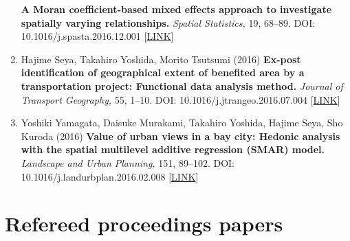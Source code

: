 \documentclass[
]{book}
\begin{document}
\begin{enumerate}
  \textbf{A Moran coefficient-based mixed effects approach to investigate spatially varying relationships.}
  \emph{Spatial Statistics,} 19, 68--89.
  DOI: 10.1016/j.spasta.2016.12.001 {[}\href{http://www.sciencedirect.com/science/article/pii/S2211675316301798}{LINK}{]}
\item
  Hajime Seya, Takahiro Yoshida, Morito Tsutsumi (2016)
  \textbf{Ex-post identification of geographical extent of benefited area by a transportation project: Functional data analysis method.}
  \emph{Journal of Transport Geography,} 55, 1--10.
  DOI: 10.1016/j.jtrangeo.2016.07.004 {[}\href{http://www.sciencedirect.com/science/article/pii/S0966692316303763}{LINK}{]}
\item
  Yoshiki Yamagata, Daisuke Murakami, Takahiro Yoshida, Hajime Seya, Sho Kuroda (2016)
  \textbf{Value of urban views in a bay city: Hedonic analysis with the spatial multilevel additive regression (SMAR) model.}
  \emph{Landscape and Urban Planning,} 151, 89--102.
  DOI: 10.1016/j.landurbplan.2016.02.008 {[}\href{http://www.sciencedirect.com/science/article/pii/S0169204616000232}{LINK}{]}
\end{enumerate}

\section*{Refereed proceedings papers}\label{refereed-proceedings-papers}
\end{document}
